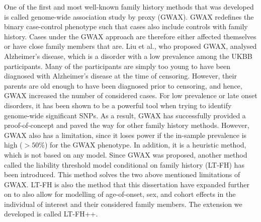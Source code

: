 One of the first and most well-known family history methods that was developed is called genome-wide association study by proxy (GWAX)\cite{gwax}. GWAX redefines the binary case-control phenotype such that cases also include controls with family history. Cases under the GWAX approach are therefore either affected themselves or have close family members that are. Liu et al., who proposed GWAX, analysed Alzheimer's disease, which is a disorder with a low prevalence among the UKBB participants. Many of the participants are simply too young to have been diagnosed with Alzheimer's disease at the time of censoring. However, their parents are old enough to have been diagnosed prior to censoring, and hence, GWAX increased the number of considered cases. For low prevalence or late onset disorders, it has been shown to be a powerful tool when trying to identify genome-wide significant SNPs\cite{hujoel2020liability,gwax,pedersen2022accounting}. As a result, GWAX has successfully provided a proof-of-concept and paved the way for other family history methods. However, GWAX also has a limitation, since it loses power if the in-sample prevalence is high ($ >50\% $) for the GWAX phenotype. In addition, it is a heuristic method, which is not based on any model. Since GWAX was proposed, another method called the liability threshold model conditional on family history (LT-FH) has been introduced. This method solves the two above mentioned limitations of GWAX. LT-FH is also the method that this dissertation have expanded further on to also allow for modelling of age-of-onset, sex, and cohort effects in the individual of interest and their considered family members. The extension we developed is called LT-FH++.

